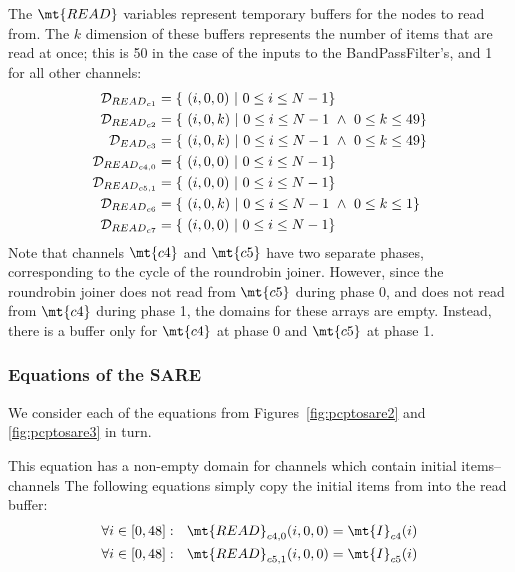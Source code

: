 
The $\mt{READ}$ variables represent temporary buffers for the nodes to
read from.  The $k$ dimension of these buffers represents the number
of items that are read at once; this is 50 in the case of the inputs
to the BandPassFilter's, and 1 for all other channels:
\begin{align*}
{\cal D}_{{READ}_{c1}} &= \{~(i,0,0)~|~0 \le i \le N-1\} \\
{\cal D}_{{READ}_{c2}} &= \{~(i,0,k)~|~0 \le i \le N-1 ~\wedge~ 0 \le k \le 49\} \\
{\cal D}_{{EAD}_{c3}} &= \{~(i,0,k)~|~0 \le i \le N-1 ~\wedge~ 0 \le k \le 49\} \\
{\cal D}_{{READ}_{{c4}, 0}} &= \{~(i,0,0)~|~0 \le i \le N-1 \} \\
{\cal D}_{{READ}_{{c5}, 1}} &= \{~(i,0,0)~|~0 \le i \le N-1 \} \\
{\cal D}_{{READ}_{c6}} &= \{~(i,0,k)~|~0 \le i \le N-1 ~\wedge~ 0 \le k \le 1 \} \\
{\cal D}_{{READ}_{c7}} &= \{~(i,0,0)~|~0 \le i \le N-1\}
\end{align*}
Note that channels $\mt{c4}$ and $\mt{c5}$ have two separate phases,
corresponding to the cycle of the roundrobin joiner.  However, since
the roundrobin joiner does not read from $\mt{c5}$ during phase 0, and
does not read from $\mt{c4}$ during phase 1, the domains for these
arrays are empty.  Instead, there is a buffer only for $\mt{c4}$ at
phase 0 and $\mt{c5}$ at phase 1.

\subsubsection{Equations of the SARE}

We consider each of the equations from Figures~\ref{fig:pcptosare2} and \ref{fig:pcptosare3} in turn.


This equation has a non-empty domain for channels which contain
initial items--channels The following equations simply copy the
initial items from into the read buffer:
\begin{align*}
\forall i \in [0, 48]:~~\mt{READ}_{{c4}, 0}(i,0,0) &= \mt{I}_{c4}(i) \\
\forall i \in [0, 48]:~~\mt{READ}_{{c5}, 1}(i,0,0) &= \mt{I}_{c5}(i) 
\end{align*}


